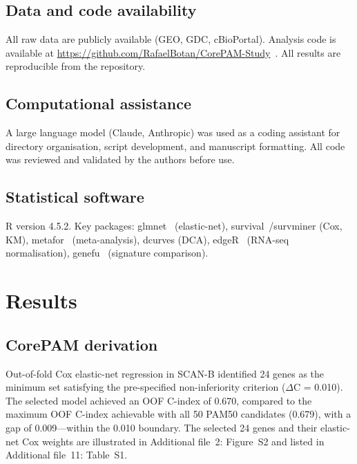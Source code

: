 \documentclass[referee,lineno,pdflatex,sn-vancouver-num]{sn-jnl}
\begin{document}
\subsection{Data and code availability}\label{subsec:data-code}

All raw data are publicly available (GEO, GDC, cBioPortal). Analysis code is available at \url{https://github.com/RafaelBotan/CorePAM-Study}~\cite{botan2026}. All results are reproducible from the repository.

\subsection{Computational assistance}\label{subsec:computational-assistance}

A large language model (Claude, Anthropic) was used as a coding assistant for directory organisation, script development, and manuscript formatting. All code was reviewed and validated by the authors before use.

\subsection{Statistical software}\label{subsec:statistical-software}

R version 4.5.2. Key packages: glmnet~\cite{friedman2010} (elastic-net), survival~\cite{therneau2000}/survminer (Cox, KM), metafor~\cite{viechtbauer2010} (meta-analysis), dcurves (DCA), edgeR~\cite{robinson2010} (RNA-seq normalisation), genefu~\cite{gendoo2016} (signature comparison).

\section{Results}\label{sec:results}

\subsection{CorePAM derivation}\label{subsec:results-derivation}

Out-of-fold Cox elastic-net regression in SCAN-B identified 24 genes as the minimum set satisfying the pre-specified non-inferiority criterion ($\Delta$C = 0.010). The selected model achieved an OOF C-index of 0.670, compared to the maximum OOF C-index achievable with all 50 PAM50 candidates (0.679), with a gap of 0.009---within the 0.010 boundary. The selected 24 genes and their elastic-net Cox weights are illustrated in Additional file~2: Figure~S2 and listed in Additional file~11: Table~S1.
\end{document}
